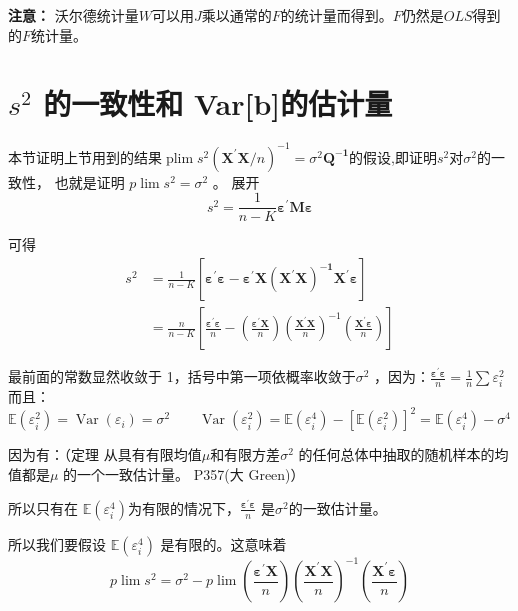 {\bf 注意：} 沃尔德统计量$ W $可以用$ J $乘以通常的$ F $的统计量而得到。$ F $仍然是$ OLS $得到的$ F $统计量。

\section{ \texorpdfstring{$ s^{2} $}{s2} 的一致性和 Var[b]的估计量}

本节证明上节用到的结果$ \operatorname{plim} s^{2}\left( \boldsymbol{X^{\prime} X} / n\right)^{-1}
    =\sigma^{2} \boldsymbol{Q^{-1}} $的假设,即证明$ s^{2} $对$ \sigma^{2} $的一致性，
也就是证明  $ p \lim s^{2} = \sigma^{2} $ 。 展开
$$ s^{2} = \frac{1}{n-K} \boldsymbol{\varepsilon^{\prime} M \varepsilon} $$

可得
$$ \begin{aligned}
    s^{2} & = \frac{1}{n-K}\left[ \boldsymbol{\varepsilon^{\prime} \varepsilon-\varepsilon^{\prime} X\left(X^{\prime} X\right)^{-1} X^{\prime} \varepsilon} \right] \\ 
          & = \frac{n}{n-K}\left[\frac{ \boldsymbol{\varepsilon^{\prime} \varepsilon}}{n}
          -\left(\frac{\boldsymbol{\varepsilon^{\prime} X}}{n}\right)\left(\frac{\boldsymbol{X^{\prime} X}}{n}\right)^{-1}
           \left(\frac{\boldsymbol{X^{\prime} \varepsilon}}{n}\right)\right]
    \end{aligned} $$

    最前面的常数显然收敛于 1，括号中第一项依概率收敛于$ \sigma^{2} $ ，因为：$ \frac{ \boldsymbol{\varepsilon^{\prime} \varepsilon}}{n}=\frac{1}{n} \sum \varepsilon_{i}^{2} $
    而且：$ \mathbb{E} \left(\varepsilon_{i}^{2}\right)=\operatorname{Var}\left(\varepsilon_{i}\right)
      =\sigma^{2} \qquad  \operatorname{Var}\left(\varepsilon_{i}^{2}\right)
      =\mathbb{E} \left(\varepsilon_{i}^{4}\right)-\left[\mathbb{E} \left(\varepsilon_{i}^{2}\right)\right]^{2}
      =\mathbb{E} \left(\varepsilon_{i}^{4}\right)-\sigma^{4} $

    因为有：（定理 从具有有限均值$ \mu  $和有限方差$ \sigma^{2} $ 的任何总体中抽取的随机样本的均值都是$ \mu  $ 的一个一致估计量。 P357(大 Green)）

    所以只有在 $ \mathbb{E} \left( \varepsilon_{i}^{4}\right) $为有限的情况下，$ \frac{ \boldsymbol{\varepsilon^{\prime} \varepsilon}}{n} $ 是$ \sigma^{2} $的一致估计量。

    所以我们要假设 $ \mathbb{E} \left(\varepsilon_{i}^{4}\right) $ 是有限的。这意味着
    $$  p \lim s^{2}=\sigma^{2}-p \lim \left(\frac{\boldsymbol{\varepsilon^{\prime} X}}{n}\right)
        \left(\frac{\boldsymbol{X^{\prime} X}}{n}\right)^{-1}\left(\frac{\boldsymbol{X^{\prime} \varepsilon}}{n}\right) $$

